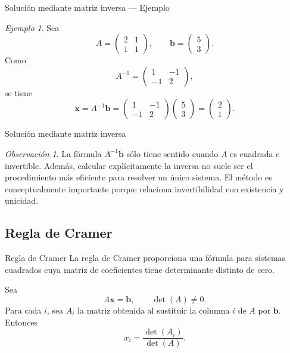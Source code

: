 \documentclass[aspectratio=169,11pt]{beamer}
\theoremstyle{remark}
\newtheorem{observacion}[definicion]{Observación}
\newtheorem{ejemplo}[definicion]{Ejemplo}
\begin{document}
\begin{frame}[shrink=5]{Solución mediante matriz inversa — Ejemplo}
\footnotesize
\begin{ejemplo}
Sea
\[
A=
\begin{pmatrix}
2&1\\
1&1
\end{pmatrix},
\qquad
\mathbf b=
\begin{pmatrix}5\\3\end{pmatrix}.
\]
Como
\[
A^{-1}=
\begin{pmatrix}
1&-1\\
-1&2
\end{pmatrix},
\]
se tiene
\[
\mathbf x=A^{-1}\mathbf b
=
\begin{pmatrix}
1&-1\\
-1&2
\end{pmatrix}
\begin{pmatrix}5\\3\end{pmatrix}
=
\begin{pmatrix}2\\1\end{pmatrix}.
\]
\end{ejemplo}
\end{frame}

\begin{frame}[shrink=5]{Solución mediante matriz inversa}
\footnotesize
\begin{observacion}
La fórmula $A^{-1}\mathbf b$ sólo tiene sentido cuando $A$ es cuadrada e invertible. Además, calcular explícitamente la inversa no suele ser el procedimiento más eficiente para resolver un único sistema. El método es conceptualmente importante porque relaciona invertibilidad con existencia y unicidad.
\end{observacion}
\end{frame}

\subsection*{Regla de Cramer}
\begin{frame}[allowframebreaks]{Regla de Cramer}
\footnotesize
La regla de Cramer proporciona una fórmula para sistemas cuadrados cuya matriz de coeficientes tiene determinante distinto de cero.

Sea
\[
A\mathbf x=\mathbf b,\qquad \det(A)\neq0.
\]
Para cada $i$, sea $A_i$ la matriz obtenida al sustituir la columna $i$ de $A$ por $\mathbf b$. Entonces
\[
\boxed{x_i=\frac{\det(A_i)}{\det(A)}}.
\]
\end{frame}
\end{document}
